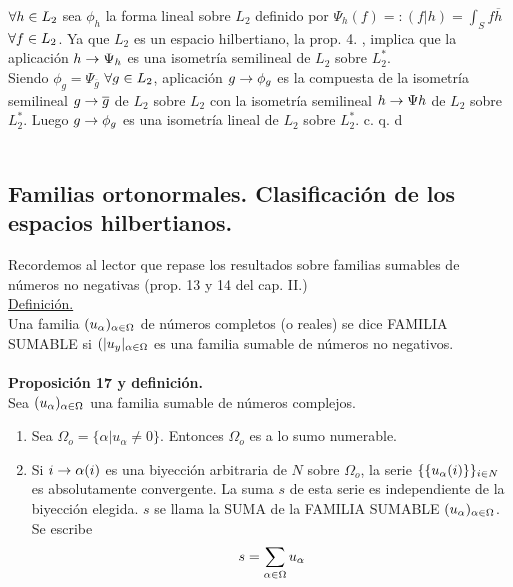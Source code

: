 $\forall h \in L_2$ sea $\phi_h$ la forma lineal sobre $L_2$ definido por $\Psi_h (f)=:(f|h)=\int_S f\overline{h}$ $\forall f \in L_2$. Ya que $L_2$ es un espacio hilbertiano, la prop. 4. , implica que la aplicación $h \rightarrow \Psi_h$ es una isometría semilineal de $L_2$ sobre $L_2^*$. \\
Siendo $\phi_g=\Psi_{\overline{g}}$ $\forall g \in L_2$, aplicación $g \rightarrow \phi_g$ es la compuesta de la isometría semilineal $g \rightarrow \overline{g}$ de $L_2$ sobre $L_2$ con la isometría semilineal $h \rightarrow \Psi h$ de $L_2$ sobre $L_2^*$. Luego $g \rightarrow \phi_g$ es una isometría lineal de $L_2$ sobre $L_2^*$.
\phantom{sssssssssssssssssssssssssssssssssss sasdasdasdasdadadssada} c. q. d \\ \\

\subsection{Familias ortonormales. Clasificación de los espacios hilbertianos.}
Recordemos al lector que repase los resultados sobre familias sumables de números no negativas (prop. 13 y 14 del cap. II.) \\
\underline{Definición.}\\
Una familia $(u_\alpha)_{\alpha \in \Omega}$ de números completos (o reales) se dice FAMILIA SUMABLE si $(|u_y|_{\alpha \in \Omega}$ es una familia sumable de números no negativos. \\ \\
\textbf{Proposición 17 y definición.} \\
Sea $(u_\alpha)_{\alpha \in \Omega}$ una familia sumable de números complejos.
\begin{enumerate}[1)]
\item Sea $\Omega_o=\lbrace \alpha| u_\alpha \neq 0 \rbrace$. Entonces $\Omega_o$ es a lo sumo numerable.
\item Si $i \rightarrow \alpha (i)$ es una biyección arbitraria de $N$ sobre $\Omega_o$, la serie $\lbrace \lbrace u_\alpha (i) \rbrace\rbrace_{i \in N}$ es absolutamente convergente. La suma $s$ de esta serie es independiente de la biyección elegida. $s$ se llama la SUMA de la FAMILIA SUMABLE $(u_\alpha)_{\alpha \in \Omega}$. Se escribe
$$
s=\sum_{\alpha \in \Omega}u_\alpha
$$

\end{enumerate}


